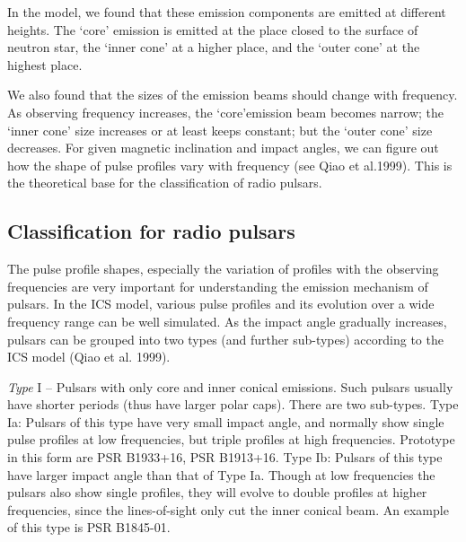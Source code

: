 In the model, we found that these emission components are emitted
at different heights. The `core' emission is emitted at the place
closed to the surface of neutron star, the `inner cone' at a
higher place, and the `outer cone' at the highest place.

We also found that the sizes of the emission beams should change
with frequency. As observing frequency increases, the
`core'emission beam becomes narrow; the `inner cone' size
increases or at least keeps constant; but the `outer cone' size
decreases. For given magnetic inclination and impact angles, we
can figure out how the shape of pulse profiles vary with frequency
(see Qiao et al.1999). This is the theoretical base for the
classification of radio pulsars.


\subsection{Classification for radio pulsars}

The pulse profile shapes, especially the variation of profiles
with the observing frequencies are very important for
understanding the emission mechanism of pulsars. In the ICS model,
various pulse profiles and its evolution over a wide frequency
range can be well simulated.  As the impact angle gradually
increases, pulsars can be grouped into two types (and further
sub-types) according to the ICS model (Qiao et al. 1999).

\vspace{2mm}
\noindent
{\it Type} I -- Pulsars with only core and
inner conical emissions. Such pulsars usually have shorter periods
(thus have larger polar caps). There are two sub-types.
%
Type Ia: Pulsars of this type have very small impact angle, and
normally show single pulse profiles at low frequencies, but triple
profiles at high frequencies. Prototype in this form are PSR
B1933+16, PSR B1913+16.
%
Type Ib: Pulsars of this type have larger impact angle than that
of Type Ia. Though at low frequencies the pulsars also show single
profiles, they will evolve to double profiles at higher
frequencies, since the lines-of-sight only cut the inner conical
beam. An example of this type is PSR B1845-01.


